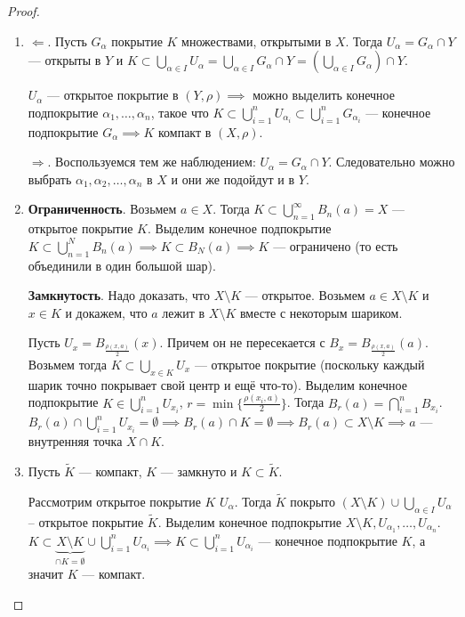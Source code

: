 \begin{proof}
    \begin{enumerate}
        \item $\Leftarrow$. Пусть  $G_\alpha$ покрытие  $K$ множествами, открытыми в $X$. Тогда  $U_\alpha = G_\alpha \cap Y$ --- открыты в  $Y$ и $K \subset \bigcup_{\alpha \in I} U_\alpha = \bigcup_{\alpha \in I} G_\alpha \cap Y = (\bigcup_{\alpha \in I} G_\alpha) \cap Y$.

             $U_\alpha$ --- открытое покрытие в  $(Y, \rho) \implies$ можно выделить конечное подпокрытие  $\alpha_1, \ldots, \alpha_n$, такое что $K \subset \bigcup\limits_{i=1}^n U_{\alpha_i} \subset \bigcup\limits_{i=1}^n G_{\alpha_i}$ --- конечное подпокрытие $G_\alpha \implies K$ компакт в  $(X, \rho)$.

              $\Rightarrow$. Воспользуемся тем же наблюдением: $U_\alpha = G_\alpha \cap Y$. Следовательно можно выбрать  $\alpha_1, \alpha_2, \ldots, \alpha_n$ в $X$ и они же подойдут и в  $Y$. 
          \item \textbf{Ограниченность}. Возьмем $a \in X$. Тогда  $K \subset \bigcup\limits_{n=1}^\infty B_n(a) = X$ --- открытое покрытие  $K$. Выделим конечное подпокрытие  $K \subset \bigcup\limits_{n=1}^N B_n(a) \implies K \subset B_N(a) \implies K$ --- ограничено (то есть объединили в один большой шар). 

              \textbf{Замкнутость}. Надо доказать, что $X \setminus K$ --- открытое. Возьмем  $a \in X \setminus K$ и $x \in K$ и докажем, что  $a$ лежит в  $X \setminus K$ вместе с некоторым шариком.

              Пусть  $U_x = B_{\frac{\rho(x, a)}{2}}(x)$. Причем он не пересекается с $B_x = B_{\frac{\rho(x, a)}{2}}(a)$. Возьмем тогда $K \subset \bigcup_{x \in K} U_x$ --- открытое покрытие (поскольку каждый шарик точно покрывает свой центр и ещё что-то). Выделим конечное подпокрытие  $K \in \bigcup\limits_{i=1}^n U_{x_i}$,  $r = \min\{\frac{\rho(x_i, a)}{2} \}$. Тогда $B_r(a) = \bigcap\limits_{i=1}^n B_{x_i}$.  $B_r(a) \cap \bigcup\limits_{i=1}^n U_{x_i} = \emptyset \implies B_r(a) \cap K = \emptyset \implies B_r(a) \subset X \setminus K \implies a$ --- внутренняя точка $X \cap K$.
          \item Пусть $\widetilde{K}$ --- компакт,  $K$ --- замкнуто и  $K \subset \widetilde{K}$.

              Рассмотрим открытое покрытие  $K$  $U_\alpha$. Тогда  $\widetilde{K}$ покрыто  $(X \setminus K) \cup \bigcup\limits_{\alpha \in I} U_\alpha$ -- открытое покрытие  $\widetilde{K}$. Выделим конечное подпокрытие  $X \setminus K, U_{\alpha_1}, \ldots, U_{\alpha_n}$. $K \subset \underbrace{X \setminus K}_{\cap K = \emptyset} \cup \bigcup\limits_{i=1}^n U_{\alpha_i} \implies K \subset \bigcup\limits_{i=1}^n U_{\alpha_i}$ --- конечное подпокрытие $K$, а значит  $K$ --- компакт.
    \end{enumerate}
\end{proof}
